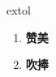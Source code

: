 
\begin{frame}
{\huge extol}
\begin{center}
\begin{enumerate}\Large
  \item \textbf{赞美}
  \item \textbf{吹捧}
\end{enumerate}
\end{center}
\end{frame}
